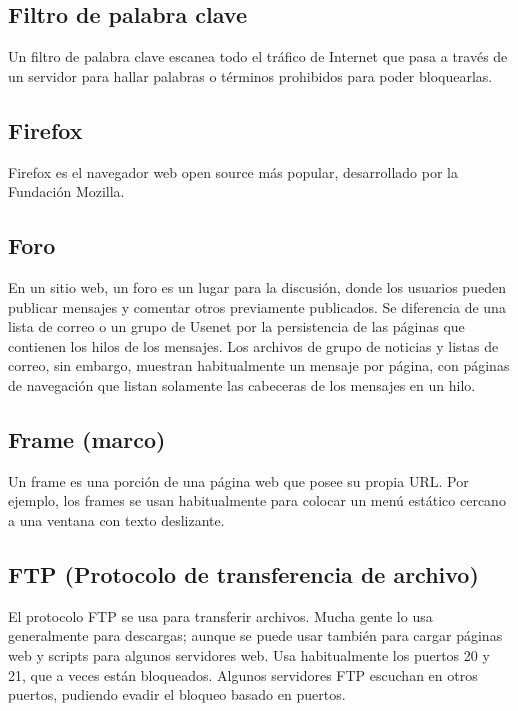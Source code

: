 \subsection{Filtro de palabra clave}\label{filtro-de-palabra-clave}

Un filtro de palabra clave escanea todo el tráfico de Internet que pasa
a través de un servidor para hallar palabras o términos prohibidos para
poder bloquearlas.

\subsection{Firefox}\label{firefox}

Firefox es el navegador web open source más popular, desarrollado por la
Fundación Mozilla.

\subsection{Foro}\label{foro}

En un sitio web, un foro es un lugar para la discusión, donde los
usuarios pueden publicar mensajes y comentar otros previamente
publicados. Se diferencia de una lista de correo o un grupo de Usenet
por la persistencia de las páginas que contienen los hilos de los
mensajes. Los archivos de grupo de noticias y listas de correo, sin
embargo, muestran habitualmente un mensaje por página, con páginas de
navegación que listan solamente las cabeceras de los mensajes en un
hilo.

\subsection{Frame (marco)}\label{frame-marco}

Un frame es una porción de una página web que posee su propia URL. Por
ejemplo, los frames se usan habitualmente para colocar un menú estático
cercano a una ventana con texto deslizante.

\subsection{FTP (Protocolo de transferencia de
archivo)}\label{ftp-protocolo-de-transferencia-de-archivo}

El protocolo FTP se usa para transferir archivos. Mucha gente lo usa
generalmente para descargas; aunque se puede usar también para cargar
páginas web y scripts para algunos servidores web. Usa habitualmente los
puertos 20 y 21, que a veces están bloqueados. Algunos servidores FTP
escuchan en otros puertos, pudiendo evadir el bloqueo basado en puertos.

